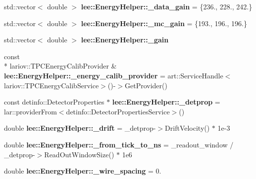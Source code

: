 \begin{DoxyCompactItemize}
\item 
\hypertarget{group__lee_gab80c71d066234aa8f0b483c34a068d55}{std\-::vector$<$ double $>$ {\bfseries lee\-::\-Energy\-Helper\-::\-\_\-data\-\_\-gain} = \{236., 228., 242.\}}\label{group__lee_gab80c71d066234aa8f0b483c34a068d55}

\item 
\hypertarget{group__lee_ga5c5abe13d6a7820e1658a802790f7e80}{std\-::vector$<$ double $>$ {\bfseries lee\-::\-Energy\-Helper\-::\-\_\-mc\-\_\-gain} = \{193., 196., 196.\}}\label{group__lee_ga5c5abe13d6a7820e1658a802790f7e80}

\item 
\hypertarget{group__lee_ga9f16c348e247cda52785e968cfad1b91}{std\-::vector$<$ double $>$ {\bfseries lee\-::\-Energy\-Helper\-::\-\_\-gain}}\label{group__lee_ga9f16c348e247cda52785e968cfad1b91}

\item 
\hypertarget{group__lee_ga4cc0815f3fccf5f704c44fc0a5ed0717}{const \\*
lariov\-::\-T\-P\-C\-Energy\-Calib\-Provider \& {\bfseries lee\-::\-Energy\-Helper\-::\-\_\-energy\-\_\-calib\-\_\-provider} = art\-::\-Service\-Handle$<$lariov\-::\-T\-P\-C\-Energy\-Calib\-Service$>$()-\/$>$Get\-Provider()}\label{group__lee_ga4cc0815f3fccf5f704c44fc0a5ed0717}

\item 
\hypertarget{group__lee_ga5dc96ef9f0d974147c51ca27e46351fa}{const detinfo\-::\-Detector\-Properties $\ast$ {\bfseries lee\-::\-Energy\-Helper\-::\-\_\-detprop} = lar\-::provider\-From$<$detinfo\-::\-Detector\-Properties\-Service$>$()}\label{group__lee_ga5dc96ef9f0d974147c51ca27e46351fa}

\item 
\hypertarget{group__lee_ga5ee65f3a1c672b4f089c05ba6b4ab132}{double {\bfseries lee\-::\-Energy\-Helper\-::\-\_\-drift} = \-\_\-detprop-\/$>$Drift\-Velocity() $\ast$ 1e-\/3}\label{group__lee_ga5ee65f3a1c672b4f089c05ba6b4ab132}

\item 
\hypertarget{group__lee_ga12d5d0f2b40a3971d57e37b1d176e45d}{double {\bfseries lee\-::\-Energy\-Helper\-::\-\_\-from\-\_\-tick\-\_\-to\-\_\-ns} = \-\_\-readout\-\_\-window / \-\_\-detprop-\/$>$Read\-Out\-Window\-Size() $\ast$ 1e6}\label{group__lee_ga12d5d0f2b40a3971d57e37b1d176e45d}

\item 
\hypertarget{group__lee_ga412905c2b45aa8103823f84f7bd7ea2a}{double {\bfseries lee\-::\-Energy\-Helper\-::\-\_\-wire\-\_\-spacing} = 0.}\label{group__lee_ga412905c2b45aa8103823f84f7bd7ea2a}


\end{DoxyCompactItemize}
